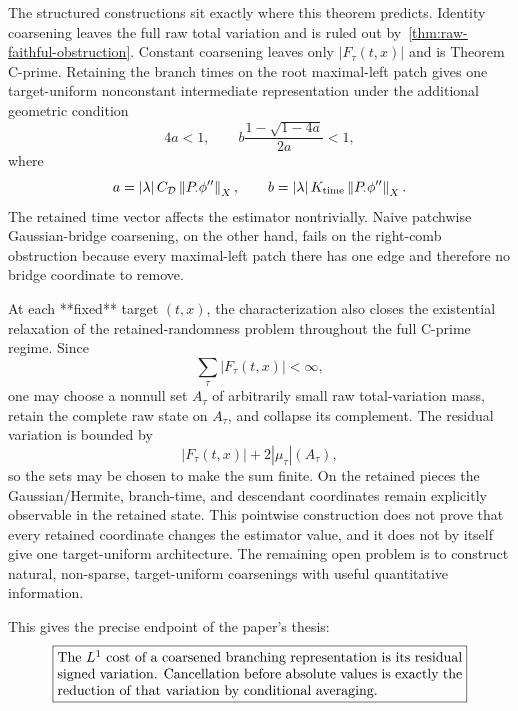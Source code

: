 The structured constructions sit exactly where this theorem predicts. Identity coarsening leaves the full raw total variation and is ruled out by~\cref{thm:raw-faithful-obstruction}. Constant coarsening leaves only $|F_\tau(t,x)|$ and is Theorem C-prime. Retaining the branch times on the root maximal-left patch gives one target-uniform nonconstant intermediate representation under the additional geometric condition
\begin{equation}
  4a<1,
  \qquad
  b\frac{1-\sqrt{1-4a}}{2a}<1,
  \label{eq:intro-time-spine-smallness}
\end{equation}
where
\begin{equation*}
  a=\left|\lambda\right| C_{\mathcal D}\left\lVert P_\cdot\phi''\right\rVert_X,
  \qquad
  b=\left|\lambda\right| K_{\mathrm{time}}\left\lVert P_\cdot\phi''\right\rVert_X.
\end{equation*}
The retained time vector affects the estimator nontrivially. Naive patchwise Gaussian-bridge coarsening, on the other hand, fails on the right-comb obstruction because every maximal-left patch there has one edge and therefore no bridge coordinate to remove.

At each **fixed** target $(t,x)$, the characterization also closes the existential relaxation of the retained-randomness problem throughout the full C-prime regime. Since
\begin{equation*}
  \sum_\tau|F_\tau(t,x)|<\infty,
\end{equation*}
one may choose a nonnull set $A_\tau$ of arbitrarily small raw total-variation mass, retain the complete raw state on $A_\tau$, and collapse its complement. The residual variation is bounded by
\begin{equation*}
  |F_\tau(t,x)|+2|\mu_\tau|(A_\tau),
\end{equation*}
so the sets may be chosen to make the sum finite. On the retained pieces the Gaussian/Hermite, branch-time, and descendant coordinates remain explicitly observable in the retained state. This pointwise construction does not prove that every retained coordinate changes the estimator value, and it does not by itself give one target-uniform architecture. The remaining open problem is to construct natural, non-sparse, target-uniform coarsenings with useful quantitative information.

This gives the precise endpoint of the paper's thesis:
\begin{equation*}
  \boxed{
  \begin{minipage}{0.84\textwidth}
  The $L^1$ cost of a coarsened branching representation is its residual signed variation. Cancellation before absolute values is exactly the reduction of that variation by conditional averaging.
  \end{minipage}}
\end{equation*}

